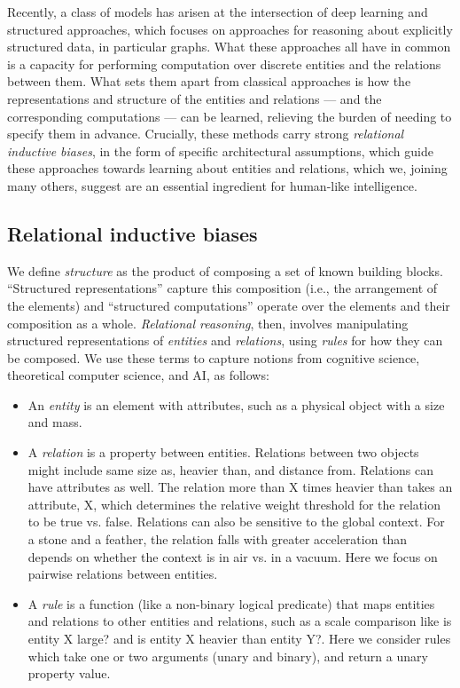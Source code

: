 \documentclass[10pt, onecolumn]{article}
\let\defaultmarginpar\marginpar
\renewcommand\marginpar[2][]{\defaultmarginpar{\itshape\color{gray}#2}}
\begin{document}
Recently, a class of models has arisen at the intersection of deep learning and structured approaches, which focuses on approaches for reasoning about explicitly structured data, in particular graphs. What these approaches all have in common is a capacity for performing computation over discrete entities and the relations between them. What sets them apart from classical approaches is how the representations and structure of the entities and relations --- and the corresponding computations --- can be learned, relieving the burden of needing to specify them in advance. Crucially, these methods carry strong \emph{relational inductive biases}, in the form of specific architectural assumptions, which guide these approaches towards learning about entities and relations, which we, joining many others, suggest are an essential ingredient for human-like intelligence.



\subsection{Relational inductive biases}

We define \emph{structure} as the product of composing a set of known building blocks. ``Structured representations'' capture this composition (i.e., the arrangement of the elements) and ``structured computations'' operate over the elements and their composition as a whole. \emph{Relational reasoning}\marginpar{relational reasoning},
then, involves manipulating structured representations of \emph{entities} and \emph{relations}, using \emph{rules} for how they can be composed. We use these terms to capture notions from cognitive science, theoretical computer science, and AI, as follows:
\begin{itemize}
    \item An \emph{entity}\marginpar{entity} is an element with attributes, such as a physical object with a size and mass.
    \item A \emph{relation}\marginpar{relation} is a property between entities. Relations between two objects might include same size as, heavier than, and distance from. Relations can have attributes as well. The relation more than X times heavier than takes an attribute, X, which determines the relative weight threshold for the relation to be true vs. false. Relations can also be sensitive to the global context. For a stone and a feather, the relation falls with greater acceleration than depends on whether the context is in air vs. in a vacuum. Here we focus on pairwise relations between entities.
    \item A \emph{rule}\marginpar{rule} is a function (like a non-binary logical predicate) that maps entities and relations to other entities and relations, such as a scale comparison like is entity X large? and is entity X heavier than entity Y?. Here we consider rules which take one or two arguments (unary and binary), and return a unary property value.
\end{itemize}
\end{document}
